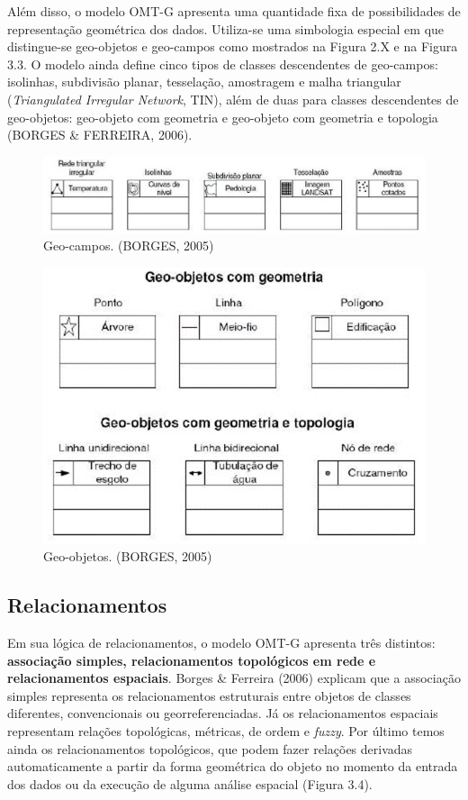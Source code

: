 		Além disso, o modelo OMT-G apresenta uma quantidade fixa de possibilidades de representação geométrica dos dados. Utiliza-se uma simbologia especial em que distingue-se geo-objetos e geo-campos como mostrados na Figura 2.X e na Figura 3.3. O modelo ainda define cinco tipos de classes descendentes de geo-campos: isolinhas, subdivisão planar, tesselação, amostragem e malha triangular (\textit{Triangulated Irregular Network}, TIN), além de duas para classes descendentes de geo-objetos: geo-objeto com geometria e geo-objeto com geometria e topologia (BORGES \& FERREIRA, 2006). 
		
		\begin{figure} [h]
			\centering
			\includegraphics[width=1\linewidth]{data/geocampos}
			\caption{Geo-campos. (BORGES, 2005)}
			\label{fig:geocampos}
		\end{figure}
	
		\begin{figure}[h]
			\centering
			\includegraphics[width=0.9\linewidth]{data/geoobjetos}
			\caption{Geo-objetos. (BORGES, 2005)}
			\label{fig:geoobjetos}
		\end{figure}
		
		\subsection{Relacionamentos}
		
		Em sua lógica de relacionamentos, o modelo OMT-G apresenta três distintos: \textbf{associação simples, relacionamentos topológicos em rede e relacionamentos espaciais}. Borges \& Ferreira (2006) explicam que a associação simples representa os relacionamentos estruturais entre objetos de classes diferentes, convencionais ou georreferenciadas. Já os relacionamentos espaciais representam relações topológicas, métricas, de ordem e \textit{fuzzy}. Por último temos ainda os relacionamentos topológicos, que podem fazer relações derivadas automaticamente a partir da forma geométrica do objeto no momento da entrada dos dados ou da execução de alguma análise espacial (Figura 3.4).
		
